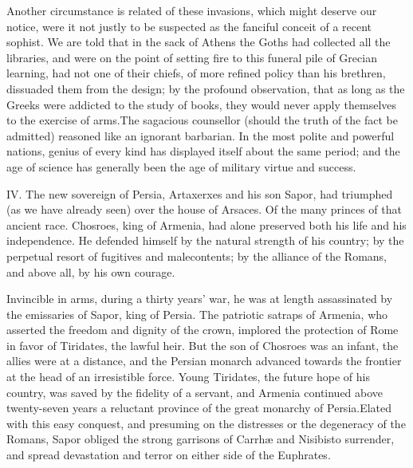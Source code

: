 

Another circumstance is related of these invasions, which might
deserve our notice, were it not justly to be suspected as the
fanciful conceit of a recent sophist. We are told that in the
sack of Athens the Goths had collected all the libraries, and
were on the point of setting fire to this funeral pile of Grecian
learning, had not one of their chiefs, of more refined policy
than his brethren, dissuaded them from the design; by the
profound observation, that as long as the Greeks were addicted to
the study of books, they would never apply themselves to the
exercise of arms.\footnotemark[133] The sagacious counsellor (should the truth
of the fact be admitted) reasoned like an ignorant barbarian. In
the most polite and powerful nations, genius of every kind has
displayed itself about the same period; and the age of science
has generally been the age of military virtue and success.


IV. The new sovereign of Persia, Artaxerxes and his son Sapor,
had triumphed (as we have already seen) over the house of
Arsaces. Of the many princes of that ancient race. Chosroes, king
of Armenia, had alone preserved both his life and his
independence. He defended himself by the natural strength of his
country; by the perpetual resort of fugitives and malecontents;
by the alliance of the Romans, and above all, by his own courage.

Invincible in arms, during a thirty years’ war, he was at length
assassinated by the emissaries of Sapor, king of Persia. The
patriotic satraps of Armenia, who asserted the freedom and
dignity of the crown, implored the protection of Rome in favor of
Tiridates, the lawful heir. But the son of Chosroes was an
infant, the allies were at a distance, and the Persian monarch
advanced towards the frontier at the head of an irresistible
force. Young Tiridates, the future hope of his country, was saved
by the fidelity of a servant, and Armenia continued above
twenty-seven years a reluctant province of the great monarchy of
Persia.\footnotemark[134] Elated with this easy conquest, and presuming on the
distresses or the degeneracy of the Romans, Sapor obliged the
strong garrisons of Carrhæ and Nisibis\footnotemark[1341] to surrender, and
spread devastation and terror on either side of the Euphrates.

